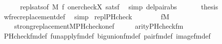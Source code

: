 \begin{isabellebody}
\ \ \ \ \isamarkupfalse%
\ repl{\isacharunderscore}{\kern0pt}sats{\isacharbrackleft}{\kern0pt}of\ M\ {\isacharquery}{\kern0pt}f\ {\isachardoublequoteopen}{\isacharbrackleft}{\kern0pt}one{\isacharcomma}{\kern0pt}rcheck{\isacharparenleft}{\kern0pt}X{\isacharparenright}{\kern0pt}{\isacharbrackright}{\kern0pt}{\isachardoublequoteclose}{\isacharbrackright}{\kern0pt}\ satsf\ \isamarkupfalse%
\ {\isacharparenleft}{\kern0pt}simp\ del{\isacharcolon}{\kern0pt}pair{\isacharunderscore}{\kern0pt}abs{\isacharparenright}{\kern0pt}\isanewline
\ \ \isamarkupfalse%
\isanewline
\ \ \isamarkupfalse%
\ {\isacharquery}{\kern0pt}thesis\ \isamarkupfalse%
\ wfrec{\isacharunderscore}{\kern0pt}replacement{\isacharunderscore}{\kern0pt}def\ \isamarkupfalse%
\ simp\isanewline
{}\isamarkupfalse%
%
\endisatagproof
{\isafoldproof}%
%
\isadelimproof
\isanewline
%
\endisadelimproof
\isanewline
{}\isamarkupfalse%
\ repl{\isacharunderscore}{\kern0pt}PHcheck\ {\isacharcolon}{\kern0pt}\isanewline
\ \ \isanewline
\ \ \ \ {\isachardoublequoteopen}f{\isasymin}M{\isachardoublequoteclose}\isanewline
\ \ \isanewline
\ \ \ \ {\isachardoublequoteopen}strong{\isacharunderscore}{\kern0pt}replacement{\isacharparenleft}{\kern0pt}{\isacharhash}{\kern0pt}{\isacharhash}{\kern0pt}M{\isacharcomma}{\kern0pt}PHcheck{\isacharparenleft}{\kern0pt}one{\isacharcomma}{\kern0pt}f{\isacharparenright}{\kern0pt}{\isacharparenright}{\kern0pt}{\isachardoublequoteclose}\isanewline
%
\isadelimproof
%
\endisadelimproof
%
\isatagproof
{}\isamarkupfalse%
\ {\isacharminus}{\kern0pt}\isanewline
\ \ \isamarkupfalse%
\ {\isachardoublequoteopen}arity{\isacharparenleft}{\kern0pt}PHcheck{\isacharunderscore}{\kern0pt}fm{\isacharparenleft}{\kern0pt}{}{\isacharcomma}{\kern0pt}{}{\isacharcomma}{\kern0pt}{}{\isacharcomma}{\kern0pt}{}{\isacharparenright}{\kern0pt}{\isacharparenright}{\kern0pt}\ {\isacharequal}{\kern0pt}\ {}{\isachardoublequoteclose}\isanewline
\ \ \ \ \isamarkupfalse%
\ PHcheck{\isacharunderscore}{\kern0pt}fm{\isacharunderscore}{\kern0pt}def\ fun{\isacharunderscore}{\kern0pt}apply{\isacharunderscore}{\kern0pt}fm{\isacharunderscore}{\kern0pt}def\ big{\isacharunderscore}{\kern0pt}union{\isacharunderscore}{\kern0pt}fm{\isacharunderscore}{\kern0pt}def\ pair{\isacharunderscore}{\kern0pt}fm{\isacharunderscore}{\kern0pt}def\ image{\isacharunderscore}{\kern0pt}fm{\isacharunderscore}{\kern0pt}def\isanewline

\end{isabellebody}
